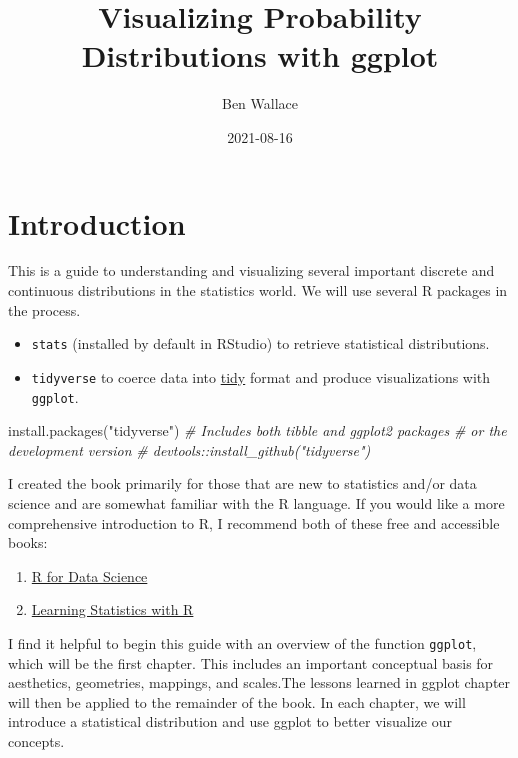 \documentclass[
]{article}
\title{Visualizing Probability Distributions with ggplot}
\author{Ben Wallace}
\date{2021-08-16}
\newenvironment{Shaded}{\begin{snugshade}}{\end{snugshade}}
\newcommand{\CommentTok}[1]{\textcolor[rgb]{0.56,0.35,0.01}{\textit{#1}}}
\newcommand{\FunctionTok}[1]{\textcolor[rgb]{0.00,0.00,0.00}{#1}}
\newcommand{\NormalTok}[1]{#1}
\newcommand{\StringTok}[1]{\textcolor[rgb]{0.31,0.60,0.02}{#1}}
\begin{document}
\maketitle

{
\setcounter{tocdepth}{2}
\tableofcontents
}
\hypertarget{introduction}{%
\section{Introduction}\label{introduction}}

This is a guide to understanding and visualizing several important discrete and continuous distributions in the statistics world. We will use several R packages in the process.

\begin{itemize}
\item
  \texttt{stats} (installed by default in RStudio) to retrieve statistical distributions.
\item
  \texttt{tidyverse} to coerce data into \href{https://r4ds.had.co.nz/tibbles.html}{tidy} format and produce visualizations with \texttt{ggplot}.
\end{itemize}

\begin{Shaded}
\begin{Highlighting}[]
\FunctionTok{install.packages}\NormalTok{(}\StringTok{"tidyverse"}\NormalTok{) }\CommentTok{\# Includes both tibble and ggplot2 packages}
\CommentTok{\# or the development version}
\CommentTok{\# devtools::install\_github("tidyverse")}
\end{Highlighting}
\end{Shaded}

I created the book primarily for those that are new to statistics and/or data science and are somewhat familiar with the R language. If you would like a more comprehensive introduction to R, I recommend both of these free and accessible books:

\begin{enumerate}
\def\labelenumi{\arabic{enumi}.}
\item
  \href{https://r4ds.had.co.nz/}{R for Data Science}
\item
  \href{https://learningstatisticswithr.com/}{Learning Statistics with R}
\end{enumerate}

I find it helpful to begin this guide with an overview of the function \texttt{ggplot}, which will be the first chapter. This includes an important conceptual basis for aesthetics, geometries, mappings, and scales.The lessons learned in ggplot chapter will then be applied to the remainder of the book. In each chapter, we will introduce a statistical distribution and use ggplot to better visualize our concepts.
\end{document}
